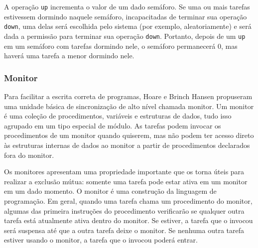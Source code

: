 A operação \texttt{up} incrementa o valor de um dado semáforo. Se uma
ou mais tarefas estivessem dormindo naquele semáforo, incapacitadas de
terminar sua operação \texttt{down}, uma delas será escolhida pelo sistema
(por exemplo, aleatoriamente) e será dada a permissão para terminar sua
operação \texttt{down}. Portanto, depois de um \texttt{up} em um semáforo
com tarefas dormindo nele, o semáforo permanecerá 0, mas haverá uma tarefa
a menor dormindo nele.

\subsubsection{Monitor}

Para facilitar a escrita correta de programas, Hoare e Brinch Hansen propuseram
uma unidade básica de sincronização de alto nível chamada monitor.
Um monitor é uma coleção de procedimentos, variáveis e estruturas de dados,
tudo isso agrupado em um tipo especial de módulo. As tarefas podem invocar
os procedimentos de um monitor quando quiserem, mas não podem ter acesso
direto às estruturas internas de dados ao monitor a partir de procedimentos
declarados fora do monitor.

Os monitores apresentam uma propriedade importante que os torna úteis
para realizar a exclusão mútua: somente uma tarefa pode estar ativa em um
monitor em um dado momento. O monitor é uma construção da linguagem de
programação. Em geral, quando uma tarefa chama um procedimento do monitor,
algumas das primeira instruções do procedimento verificarão se qualquer
outra tarefa está atualmente ativa dentro do monitor. Se estiver, a tarefa
que o invocou será suspensa até que a outra tarefa deixe o monitor. Se nenhuma
outra tarefa estiver usando o monitor, a tarefa que o invocou poderá entrar.

%

